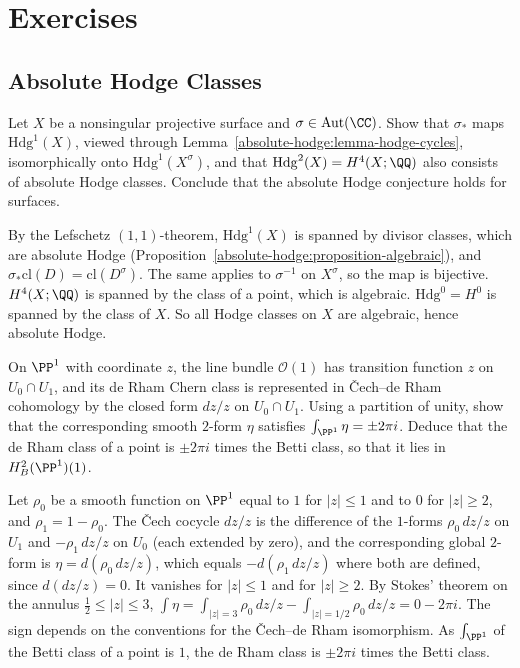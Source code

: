 \section{Exercises}\label{absolute-hodge:section-exercises}

\subsection{Absolute Hodge Classes}\label{absolute-hodge:subsection-exercises-absolute-hodge-classes}

\begin{exercise}\label{absolute-hodge:exercise-picard}
Let $X$ be a nonsingular projective surface and $\sigma \in \mathrm{Aut}(\CC)$. Show that $\sigma_*$ maps $\mathrm{Hdg}^1(X)$, viewed through Lemma~\ref{absolute-hodge:lemma-hodge-cycles}, isomorphically onto
$\mathrm{Hdg}^1(X^\sigma)$, and that $\mathrm{Hdg}^2(X) = H^4(X; \QQ)$ also consists of absolute Hodge classes. Conclude that the absolute Hodge conjecture holds for surfaces.
\end{exercise}

\begin{solution}
By the Lefschetz $(1,1)$-theorem, $\mathrm{Hdg}^1(X)$ is spanned by divisor classes, which are absolute Hodge (Proposition~\ref{absolute-hodge:proposition-algebraic}), and $\sigma_*\mathrm{cl}(D) = \mathrm{cl}(D^\sigma)$.
The same applies to $\sigma^{-1}$ on $X^\sigma$, so the map is bijective. $H^4(X; \QQ)$ is spanned by the class of a point, which is algebraic. $\mathrm{Hdg}^0 = H^0$ is spanned by the class of $X$. So all Hodge
classes on $X$ are algebraic, hence absolute Hodge.
\end{solution}

\begin{exercise}\label{absolute-hodge:exercise-two-pi-i}
On $\PP^1$ with coordinate $z$, the line bundle $\mathcal{O}(1)$ has transition function $z$ on $U_0 \cap U_1$, and its de Rham Chern class is represented in \v{C}ech--de Rham cohomology by the closed
form $dz/z$ on $U_0 \cap U_1$. Using a partition of unity, show that the corresponding smooth $2$-form $\eta$ satisfies $\int_{\PP^1}\eta = \pm 2\pi i$. Deduce that the de Rham class of a point is $\pm 2\pi i$ times the
Betti class, so that it lies in $H^2_B(\PP^1)(1)$.
\end{exercise}

\begin{solution}
Let $\rho_0$ be a smooth function on $\PP^1$ equal to $1$ for $|z| \leq 1$ and to $0$ for $|z| \geq 2$, and $\rho_1 = 1 - \rho_0$. The \v{C}ech cocycle $dz/z$ is the difference of the $1$-forms $\rho_0\,dz/z$ on $U_1$ and
$-\rho_1\,dz/z$ on $U_0$ (each extended by zero), and the corresponding global $2$-form is $\eta = d(\rho_0\,dz/z)$, which equals $-d(\rho_1\,dz/z)$ where both are defined, since $d(dz/z) = 0$. It vanishes for $|z| \leq 1$
and for $|z| \geq 2$. By Stokes' theorem on the annulus $\frac12 \leq |z| \leq 3$, $\int\eta = \int_{|z|=3}\rho_0\,dz/z - \int_{|z|=1/2}\rho_0\,dz/z = 0 - 2\pi i$. The sign depends on the conventions for the
\v{C}ech--de Rham isomorphism. As $\int_{\PP^1}$ of the Betti class of a point is $1$, the de Rham class is $\pm 2\pi i$ times the Betti class.
\end{solution}

